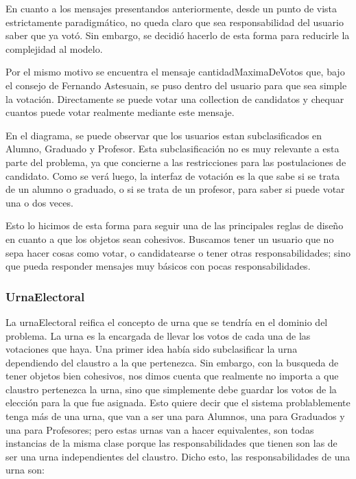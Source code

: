 En cuanto a los mensajes presentandos anteriormente, desde un punto de vista estrictamente paradigm\'atico, no queda claro que sea responsabilidad del usuario saber que ya vot\'o. Sin embargo, se decidi\'o hacerlo de esta forma para reducirle la complejidad al modelo.

Por el mismo motivo se encuentra el mensaje cantidadMaximaDeVotos que, bajo el consejo de Fernando Astesuain, se puso dentro del usuario para que sea simple la votaci\'on. Directamente se puede votar una collection de candidatos y chequar cuantos puede votar realmente mediante este mensaje.

En el diagrama, se puede observar que los usuarios estan subclasificados en Alumno, Graduado y Profesor. Esta subclasificaci\'on no es muy relevante a esta parte del problema, ya que concierne a las restricciones para las postulaciones de candidato. Como se ver\'a luego, la interfaz de votaci\'on es la que sabe si se trata de un alumno o graduado, o si se trata de un profesor, para saber si puede votar una o dos veces.

Esto lo hicimos de esta forma para seguir una de las principales reglas de diseño en cuanto a que los objetos sean cohesivos. Buscamos tener un usuario que no sepa hacer cosas como votar, o candidatearse o tener otras responsabilidades; sino que pueda responder mensajes muy b\'asicos con pocas responsabilidades.

\subsubsection{UrnaElectoral}

La urnaElectoral reifica el concepto de urna que se tendr\'ia en el dominio del problema. La urna es la encargada de llevar los votos de cada una de las votaciones que haya. Una primer idea hab\'ia sido subclasificar la urna dependiendo del claustro a la que pertenezca. Sin embargo, con la busqueda de tener objetos bien cohesivos, nos dimos cuenta que realmente no importa a que claustro pertenezca la urna, sino que simplemente debe guardar los votos de la elecci\'on para la que fue asignada. Esto quiere decir que el sistema problablemente tenga m\'as de una urna, que van a ser una para Alumnos, una para Graduados y una para Profesores; pero estas urnas van a hacer equivalentes, son todas instancias de la misma clase porque las responsabilidades que tienen son las de ser una urna independientes del claustro. Dicho esto, las responsabilidades de una urna son:

